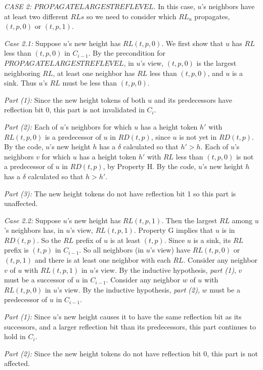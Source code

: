 \documentclass{article}
\begin{document}
\textit{CASE 2:} $PROPAGATELARGESTREFLEVEL$. In this case, $u$’s neighbors have at least two different $RLs$ so we need to consider which $RL_u$ propagates, $(t, p, 0)$ or $(t, p, 1)$.

\textit{Case 2.1:}
Suppose $u$’s new height has $RL(t, p, 0)$. We first show that $u$ has $RL$ less than $(t, p, 0)$ in $C_{i − 1}$. By the precondition for $PROPAGATELARGESTREFLEVEL$, in $u$’s view, $(t, p, 0)$ is the largest neighboring $RL$, at least one neighbor has $RL$ less than $(t, p, 0)$, and $u$ is a sink. Thus $u$’s $RL$ must be less than $(t, p, 0)$.

\textit{Part (1):}
Since the new height tokens of both $u$ and its predecessors have reflection bit 0, this part is not invalidated
in $C_i$.

\textit{Part (2):}
Each of $u$’s neighbors for which $u$ has a height token $h'$ with $RL(t, p, 0)$ is a predecessor of $u$ in $RD(t, p)$, since $u$ is not yet in $RD(t, p)$. By the code, $u$’s new height $h$ has a $\delta $ calculated so that $h' > h$. Each of $u$’s neighbors $v$ for which $u$ has a height token $h'$ with $RL$ less than $(t, p, 0)$ is not a predecessor of $u$ in $RD(t, p)$, by Property H. By the code, $u$’s new height $h$ has a $\delta $ calculated so that $h > h'$.

\textit{Part (3):}
The new height tokens do not have reflection bit 1 so this part is unaffected.

\textit{Case 2.2:}
Suppose $u$’s new height has $RL(t, p, 1)$. Then the largest $RL$ among $u$’s neighbors has, in $u$’s view, $RL(t, p, 1)$. Property G implies that $u$ is in $RD(t, p)$. So the $RL$ prefix of $u$ is at least $(t, p)$. Since $u$ is a sink, its $RL$ prefix is $(t, p)$ in $C_{i − 1}$. So all neighbors (in $u$’s view) have $RL(t, p, 0)$ or $(t, p, 1)$ and there is at least one neighbor with each $RL$. Consider any neighbor $v$ of $u$ with $RL (t, p, 1)$ in $u$’s view. By the inductive hypothesis, \textit{part (1)}, $v$ must be a successor of $u$ in $C_{i − 1}$. Consider any neighbor $w$ of $u$ with $RL(t, p, 0)$ in $u$’s view. By the inductive hypothesis, \textit{part (2)}, $w$ must be a predecessor of $u$ in $C_{i − 1}$.

\textit{Part (1):}
Since $u$’s new height causes it to have the same reflection bit as its successors, and a larger reflection bit than its predecessors, this part continues to hold in $C_i$.

\textit{Part (2):}
Since the new height tokens do not have reflection bit 0, this part is not affected.
\end{document}
